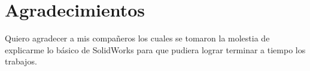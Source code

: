     \section{Agradecimientos}
    
    Quiero agradecer a mis compañeros los cuales se tomaron la molestia de explicarme lo básico de SolidWorks para que pudiera lograr terminar a tiempo los trabajos.
    
    
    
    
